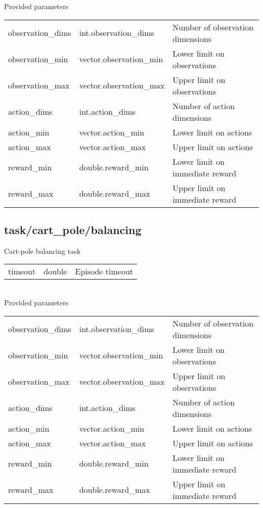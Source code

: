 \noindent Provided parameters\\

\noindent\begin{tabular}{@{}lll@{}}
observation\_dims&int.observation\_dims&Number of observation dimensions\\
observation\_min&vector.observation\_min&Lower limit on observations\\
observation\_max&vector.observation\_max&Upper limit on observations\\
action\_dims&int.action\_dims&Number of action dimensions\\
action\_min&vector.action\_min&Lower limit on actions\\
action\_max&vector.action\_max&Upper limit on actions\\
reward\_min&double.reward\_min&Lower limit on immediate reward\\
reward\_max&double.reward\_max&Upper limit on immediate reward\\
\end{tabular}
\subsection{task/cart\_pole/balancing}
\noindent Cart-pole balancing task\\

\noindent\begin{tabular}{@{}lll@{}}
timeout&double&Episode timeout\\
\end{tabular}
\\

\noindent Provided parameters\\

\noindent\begin{tabular}{@{}lll@{}}
observation\_dims&int.observation\_dims&Number of observation dimensions\\
observation\_min&vector.observation\_min&Lower limit on observations\\
observation\_max&vector.observation\_max&Upper limit on observations\\
action\_dims&int.action\_dims&Number of action dimensions\\
action\_min&vector.action\_min&Lower limit on actions\\
action\_max&vector.action\_max&Upper limit on actions\\
reward\_min&double.reward\_min&Lower limit on immediate reward\\
reward\_max&double.reward\_max&Upper limit on immediate reward\\
\end{tabular}
